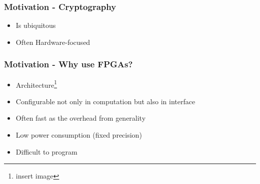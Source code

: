 \begin{frame}
  \frametitle{Motivation - Cryptography}
  \begin{itemize}
    \item Is ubiquitous
    \item Often Hardware-focused
  \end{itemize}
\end{frame}

\begin{frame}
  \frametitle{Motivation - Why use FPGAs?}
  \begin{itemize}
    \item Architecture\footnote{insert image}
    \item Configurable not only in computation but also in interface
    \item Often fast as the overhead from generality
    \item Low power consumption (fixed precision)
    \item Difficult to program
  \end{itemize}
\end{frame}
